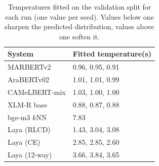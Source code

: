 \begin{table}[t]\centering\small\caption{Temperatures fitted on the validation split for each run (one value per seed). Values below one sharpen the predicted distribution, values above one soften it.}\label{tab:temps}
\begin{tabular}{ll}\toprule
System & Fitted temperature(s) \\\midrule
MARBERTv2 & 0.96, 0.95, 0.91 \\
AraBERTv02 & 1.01, 1.01, 0.99 \\
CAMeLBERT-mix & 1.03, 1.00, 1.00 \\
XLM-R base & 0.88, 0.87, 0.88 \\
bge-m3 $k$NN & 7.83 \\
Laya (RLCD) & 1.43, 3.04, 3.08 \\
Laya (CE) & 2.85, 2.85, 2.60 \\
Laya (12-way) & 3.66, 3.84, 3.65 \\
\bottomrule\end{tabular}\end{table}
